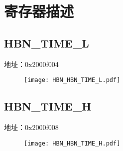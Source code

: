 \section{寄存器描述}

\subsection{HBN\_TIME\_L}
\label{HBN-HBN-TIME-L}
地址：0x2000f004
 \begin{figure}[H]
\texttt{[image: HBN\_HBN\_TIME\_L.pdf]}
\end{figure}

\subsection{HBN\_TIME\_H}
\label{HBN-HBN-TIME-H}
地址：0x2000f008
 \begin{figure}[H]
\texttt{[image: HBN\_HBN\_TIME\_H.pdf]}
\end{figure}

